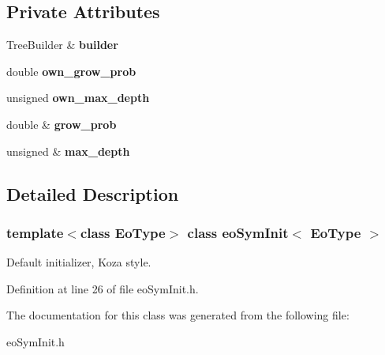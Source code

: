 \subsection*{Private Attributes}
\begin{CompactItemize}
\item 
Tree\-Builder \& {\bf builder}\label{classeo_sym_init_r0}

\item 
double {\bf own\_\-grow\_\-prob}\label{classeo_sym_init_r1}

\item 
unsigned {\bf own\_\-max\_\-depth}\label{classeo_sym_init_r2}

\item 
double \& {\bf grow\_\-prob}\label{classeo_sym_init_r3}

\item 
unsigned \& {\bf max\_\-depth}\label{classeo_sym_init_r4}

\end{CompactItemize}


\subsection{Detailed Description}
\subsubsection*{template$<$class Eo\-Type$>$ class eo\-Sym\-Init$<$ Eo\-Type $>$}

Default initializer, Koza style. 



Definition at line 26 of file eo\-Sym\-Init.h.

The documentation for this class was generated from the following file:\begin{CompactItemize}
\item 
eo\-Sym\-Init.h\end{CompactItemize}
